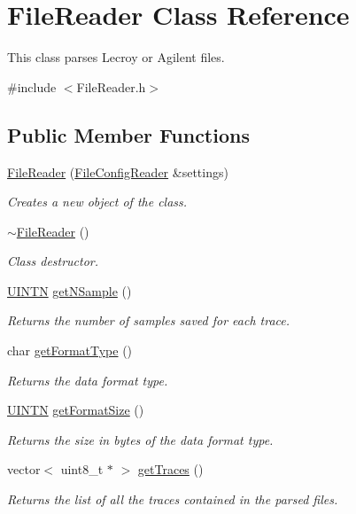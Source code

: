 \hypertarget{classFileReader}{
\section{FileReader Class Reference}
\label{classFileReader}
}


This class parses Lecroy or Agilent files.  




{\ttfamily \#include $<$FileReader.h$>$}

\subsection*{Public Member Functions}
\begin{DoxyCompactItemize}
\item 
\hyperlink{classFileReader_a9b1556c5302286089c8407dca940dc2b}{FileReader} (\hyperlink{classFileConfigReader}{FileConfigReader} \&settings)
\begin{DoxyCompactList}\small\item\em Creates a new object of the class. \end{DoxyCompactList}\item 
\hyperlink{classFileReader_a1382969e8f1468f3b04ad4b44ab39dee}{$\sim$FileReader} ()
\begin{DoxyCompactList}\small\item\em Class destructor. \end{DoxyCompactList}\item 
\hyperlink{common_8h_a271e567655d46ec23cdcca42c1deab91}{UINTN} \hyperlink{classFileReader_a5a07f2601d01337aa0dd7bef5741bebb}{getNSample} ()
\begin{DoxyCompactList}\small\item\em Returns the number of samples saved for each trace. \end{DoxyCompactList}\item 
char \hyperlink{classFileReader_ac013c664548aa7ed856f6f2b6c886256}{getFormatType} ()
\begin{DoxyCompactList}\small\item\em Returns the data format type. \end{DoxyCompactList}\item 
\hyperlink{common_8h_a271e567655d46ec23cdcca42c1deab91}{UINTN} \hyperlink{classFileReader_a6f003c703cce9103b407dc2707847603}{getFormatSize} ()
\begin{DoxyCompactList}\small\item\em Returns the size in bytes of the data format type. \end{DoxyCompactList}\item 
vector$<$ uint8\_\-t $\ast$ $>$ \hyperlink{classFileReader_a1702a2bace29f33e72d6c75529617a01}{getTraces} ()
\begin{DoxyCompactList}\small\item\em Returns the list of all the traces contained in the parsed files. \end{DoxyCompactList}\end{DoxyCompactItemize}


